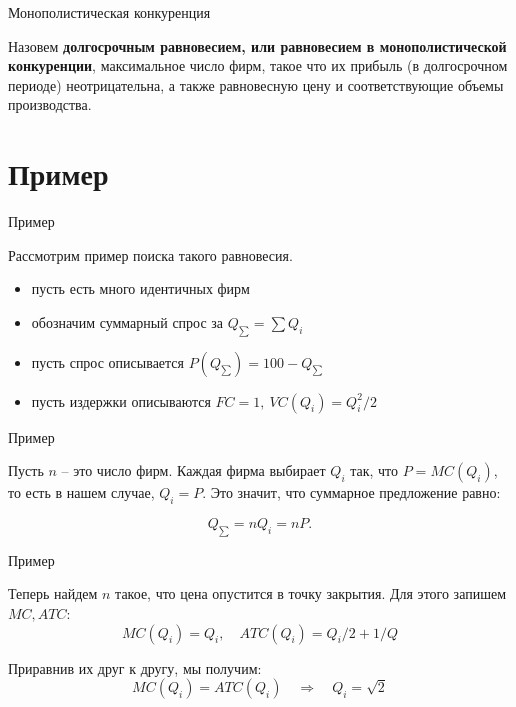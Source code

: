 \documentclass{beamer}
\begin{document}
\begin{frame}{Монополистическая конкуренция}

\begin{definition}
Назовем \textbf{долгосрочным равновесием, или равновесием в монополистической конкуренции}, максимальное число фирм, такое что их прибыль (в долгосрочном периоде) неотрицательна, а также равновесную цену и соответствующие объемы производства.
\end{definition}

\end{frame}

\section{Пример}

\begin{frame}{Пример}

Рассмотрим пример поиска такого равновесия.

\begin{itemize}
\item пусть есть много идентичных фирм
\item обозначим суммарный спрос за $Q_{\sum} = \sum Q_i$
\item пусть спрос описывается $P(Q_{\sum}) = 100 - Q_{\sum}$
\item пусть издержки описываются $FC = 1, \ VC(Q_i) = Q_i^2/2$
\end{itemize}

\end{frame}

\begin{frame}{Пример}

Пусть $n$ – это число фирм. Каждая фирма выбирает $Q_i$ так, что $P = MC(Q_i)$, то есть в нашем случае, $Q_i = P$. Это значит, что суммарное предложение равно: 

$$Q_{\sum} = n Q_i = n P.$$

\end{frame}

\begin{frame}{Пример}

Теперь найдем $n$ такое, что цена опустится в точку закрытия. Для этого запишем $MC, ATC$:
$$ MC(Q_i) = Q_i, \quad ATC(Q_i) = Q_i/2 + 1/Q$$

Приравнив их друг к другу, мы получим:
$$ MC(Q_i) = ATC(Q_i) \quad \Rightarrow \quad Q_i = \sqrt{2}$$

\end{frame}
\end{document}
